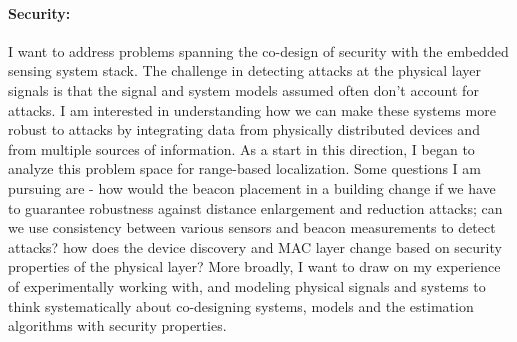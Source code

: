 \documentclass[10pt]{article}
\begin{document}
\paragraph{Security: }
I want to address problems spanning the co-design of security with the embedded sensing system stack. %
The challenge in detecting attacks at the physical layer signals is that %
the signal and system models assumed often don't
account for attacks. I am interested in understanding how we can make these systems more robust to attacks by integrating
data from physically distributed devices and from multiple sources of
information. As a start
in this direction, I began to analyze this problem space for
range-based localization. %
Some questions I am pursuing are - how would the beacon placement in a building change
if we have to guarantee robustness against distance enlargement and reduction attacks; can we use
consistency between various sensors and beacon measurements to detect attacks? 
how does the device discovery and MAC layer change based on security
properties of the physical layer? %
More broadly, I want to draw on my experience of experimentally
working with, and modeling physical signals and systems to think systematically
about co-designing systems, models and the estimation algorithms with security properties. %

\end{document}
